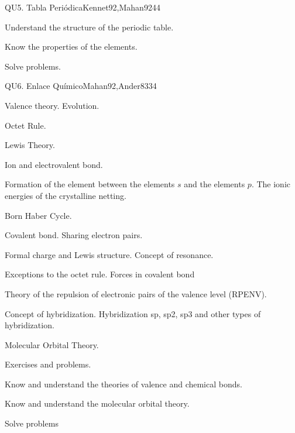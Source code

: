 \begin{syllabus}
\begin{unit}{}{QU5. Tabla Periódica}{Kennet92,Mahan92}{4}{4}
\begin{topics}
   \end{topics}

   \begin{learningoutcomes}
      \item Understand the structure of the periodic table.
      \item Know the properties of the elements.
      \item Solve problems.


   \end{learningoutcomes}
\end{unit}

\begin{unit}{}{QU6. Enlace Químico}{Mahan92,Ander83}{3}{4}
   \begin{topics}
        \item Valence theory. Evolution.
	\item Octet Rule.
	\item Lewis Theory.
	\item Ion and electrovalent bond.
	\item Formation of the element between the elements $ s $ and the elements $ p $. The ionic energies of the crystalline netting.
	\item Born Haber Cycle.
	\item Covalent bond. Sharing electron pairs.
	\item Formal charge and Lewis structure. Concept of resonance.
	\item Exceptions to the octet rule. Forces in covalent bond
	\item Theory of the repulsion of electronic pairs of the valence level (RPENV).
	\item Concept of hybridization. Hybridization sp, sp2, sp3 and other types of hybridization.
	\item Molecular Orbital Theory.
	\item Exercises and problems.
   \end{topics}

   \begin{learningoutcomes}

      \item Know and understand the theories of valence and chemical bonds.
      \item Know and understand the molecular orbital theory.
      \item Solve problems
   \end{learningoutcomes}
\end{unit}


\end{syllabus}
